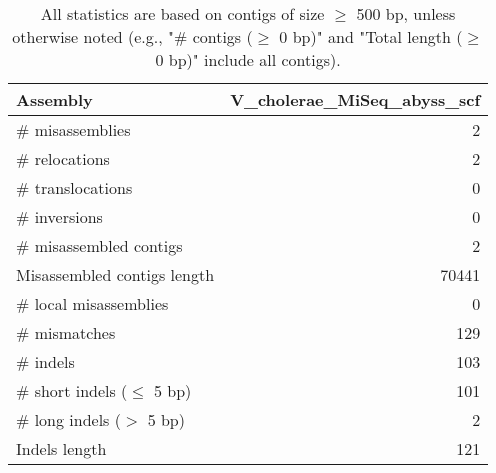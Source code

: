 \documentclass[12pt,a4paper]{article}
\begin{document}
\begin{table}[ht]
\begin{center}
\caption{All statistics are based on contigs of size $\geq$ 500 bp, unless otherwise noted (e.g., "\# contigs ($\geq$ 0 bp)" and "Total length ($\geq$ 0 bp)" include all contigs).}
\begin{tabular}{|l*{1}{|r}|}
\hline
Assembly & V\_cholerae\_MiSeq\_abyss\_scf \\ \hline
\# misassemblies & 2 \\ \hline
\hspace{5mm}\# relocations & 2 \\ \hline
\hspace{5mm}\# translocations & 0 \\ \hline
\hspace{5mm}\# inversions & 0 \\ \hline
\# misassembled contigs & 2 \\ \hline
Misassembled contigs length & 70441 \\ \hline
\# local misassemblies & 0 \\ \hline
\# mismatches & 129 \\ \hline
\# indels & 103 \\ \hline
\hspace{5mm}\# short indels ($\leq$ 5 bp) & 101 \\ \hline
\hspace{5mm}\# long indels ($>$ 5 bp) & 2 \\ \hline
Indels length & 121 \\ \hline
\end{tabular}
\end{center}
\end{table}
\end{document}
